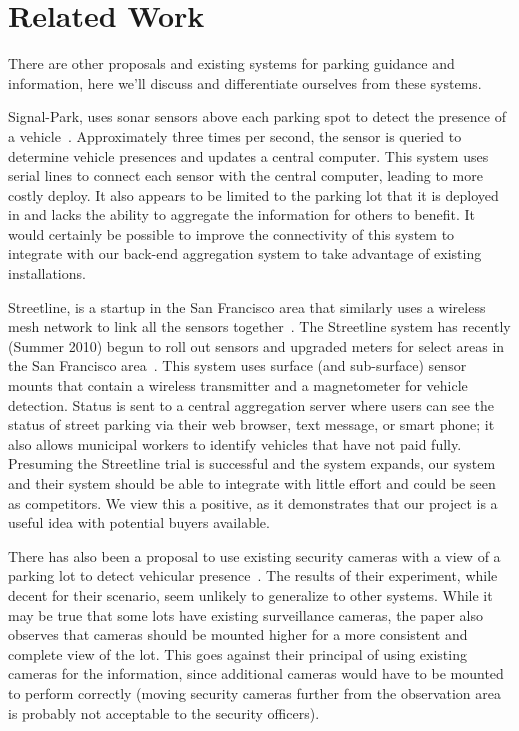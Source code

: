 \documentclass{acm_proc}
\begin{document}
\section{Related Work}\label{sec:related}

There are other proposals and existing systems for parking guidance and
information, here we'll discuss and differentiate ourselves from these
systems.

Signal-Park, uses sonar sensors above each parking spot to detect the
presence of a vehicle~\cite{pgi:signal-park}.
Approximately three times per second, the sensor is queried to determine
vehicle presences and updates a central computer.
This system uses serial lines to connect each sensor with the central
computer, leading to more costly deploy.
It also appears to be limited to the parking lot that it is deployed in and
lacks the ability to aggregate the information for others to benefit.
It would certainly be possible to improve the connectivity of this system
to integrate with our back-end aggregation system to take advantage of
existing installations.

Streetline, is a startup in the San Francisco area that similarly uses a
wireless mesh network to link all the sensors
together~\cite{pgi:streetline}.
The Streetline system has recently (Summer 2010) begun to roll out sensors
and upgraded meters for select areas in the San Francisco
area~\cite{wired:streetline, sfpark}.
This system uses surface (and sub-surface) sensor mounts that contain a
wireless transmitter and a magnetometer for vehicle detection.
Status is sent to a central aggregation server where users can see the
status of street parking via their web browser, text message, or smart
phone; it also allows municipal workers to identify vehicles that have not
paid fully.
Presuming the Streetline trial is successful and the system expands, our
system and their system should be able to integrate with little effort and
could be seen as competitors.
We view this a positive, as it demonstrates that our project is a useful
idea with potential buyers available.

There has also been a proposal to use existing security cameras with a view
of a parking lot to detect vehicular presence~\cite{lin:vision-parking}.
The results of their experiment, while decent for their scenario, seem
unlikely to generalize to other systems.
While it may be true that some lots have existing surveillance cameras, the
paper also observes that cameras should be mounted higher for a more
consistent and complete view of the lot.
This goes against their principal of using existing cameras for the
information, since additional cameras would have to be mounted to perform
correctly (moving security cameras further from the observation area is
probably not acceptable to the security officers).
\end{document}
